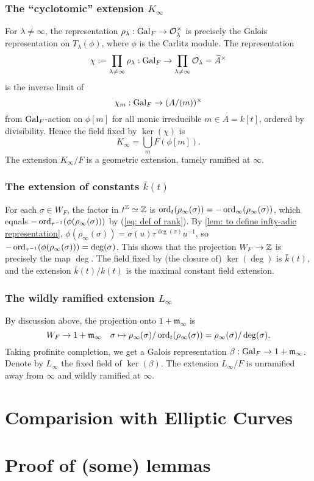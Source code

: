\documentclass{article}
\renewcommand{\O}{\mathcal{O}}
\newcommand{\m}{\mathfrak{m}}
\begin{document}
\subsubsection*{The ``cyclotomic'' extension \texorpdfstring{$K_\infty$}{K_infty}}
For $\lambda\ne\infty$, the representation $\rho_\lambda : \gal_F\to \O_\lambda^\times$ is precisely the Galois representation on $T_\lambda(\phi)$, where $\phi$ is the Carlitz module.
The representation \[\chi := \prod_{\lambda\ne\infty}\rho_\lambda : \gal_F\to \prod_{\lambda\ne\infty}\O_\lambda = \hat A^\times\]
is the inverse limit of \[\chi_m : \operatorname{Gal}_F\to (A/(m))^\times\] from $\operatorname{Gal}_F$-action on $\phi[m]$ for all monic irreducible $m\in A = k[t]$, ordered by divisibility.
Hence the field fixed by $\ker(\chi)$ is \[K_\infty = \bigcup_{m} F(\phi[m]).\]
The extension $K_\infty/F$ is a geometric extension, tamely ramified at $\infty$.

\subsubsection*{The extension of constants \texorpdfstring{$\bar{k}(t)$}{bark(t)}}
For each $\sigma\in W_F$, the factor in $t^{\mathbb{Z}}\simeq \mathbb{Z}$ is
$\operatorname{ord}_{t}(\rho_\infty(\sigma)) = - \operatorname{ord}_{\infty}(\rho_\infty(\sigma))$, which equals $-\operatorname{ord}_{\tau^{-1}}(\phi(\rho_\infty(\sigma)))$ by (\ref{eq: def of rank}).
By \cref{lem: to define infty-adic representation}, $\phi(\rho_\infty(\sigma)) = \sigma(u)\tau^{\deg(\sigma)}u^{-1}$,
so $-\operatorname{ord}_{\tau^{-1}}(\phi(\rho_\infty(\sigma))) = \deg(\sigma)$.
This shows that the projection $W_F\to \mathbb{Z}$ is precisely the map $\deg$.
The field fixed by (the closure of) $\ker(\deg)$ is $\bar{k}(t)$,
and the extension $\bar{k}(t)/k(t)$ is the maximal constant field extension.


\subsubsection*{The wildly ramified extension \texorpdfstring{$L_\infty$}{L_\infty}}
By discussion above, the projection onto $1 + \m_\infty$ is
\[W_F\to 1 + \m_\infty\quad \sigma\mapsto \rho_\infty(\sigma)/\ord_t(\rho_\infty(\sigma)) = \rho_\infty(\sigma)/\deg(\sigma).\]
Taking profinite completion, we get a Galois representation
$\beta : \gal_F\to 1 + \m_\infty$.
Denote by $L_\infty$ the fixed field of $\ker(\beta)$.
The extension $L_\infty/F$ is unramified away from $\infty$ and wildly ramified at $\infty$.



\section{Comparision with Elliptic Curves}




\section{Proof of (some) lemmas}
\end{document}
